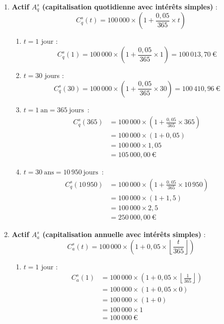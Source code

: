 \documentclass{article}
\begin{document}
\begin{enumerate}[label=\textbf{Q\arabic*.}]
    \item \textbf{Actif \( A_q^s \) (capitalisation quotidienne avec intérêts simples)} : 
    \[
    C_q^s(t) = 100\,000 \times \left(1 + \frac{0,05}{365} \times t\right)
    \]
    \begin{enumerate}[label=(\alph*)]
        \item \( t = 1 \) jour : 
        \[
        C_q^s(1) = 100\,000 \times \left(1 + \frac{0,05}{365} \times 1\right) = \boxed{100\,013,70\ \text{€}}
        \]
        
        \item $t = 30$ jours : 
        \[
        C_q^s(30) = 100\,000 \times \left(1 + \frac{0,05}{365} \times 30\right) = \boxed{100\,410,96\ \text{€}}
        \]
        
        \item $t = 1\ \text{an} = 365\ \text{jours}$~: 
        \begin{align*}
        C_q^s(365) &= 100\,000 \times \left(1 + \frac{0,05}{365} \times 365\right) \\
                 &= 100\,000 \times (1 + 0,05) \\
                 &= 100\,000 \times 1,05 \\
                 &= \boxed{105\,000,00\ \text{€}}
        \end{align*}
        
        \item $t = 30\ \text{ans} = 10\,950\ \text{jours}$~: 
        \begin{align*}
        C_q^s(10\,950) &= 100\,000 \times \left(1 + \frac{0,05}{365} \times 10\,950\right) \\
                &= 100\,000 \times (1 + 1,5) \\
                 &= 100\,000 \times 2,5 \\
                 &= \boxed{250\,000,00\ \text{€}}
        \end{align*}
        
    \end{enumerate}

    \item \textbf{Actif \( A_a^s \) (capitalisation annuelle avec intérêts simples)} : 
    \[
    C_a^s(t) = 100\,000 \times \left(1 + 0,05 \times \left\lfloor \frac{t}{365} \right\rfloor \right)
    \]
    \begin{enumerate}[label=(\alph*)]
        \item \( t = 1 \) jour : 
        \begin{align*}
        C_a^s(1) &= 100\,000 \times \left(1 + 0,05 \times \left\lfloor \frac{1}{365} \right\rfloor \right) \\
                 &= 100\,000 \times \left(1 + 0,05 \times 0 \right) \\
                 &= 100\,000 \times (1 + 0) \\
                 &= 100\,000 \times 1 \\
                 &= \boxed{100\,000\ \text{€}}
        \end{align*}
        

\end{enumerate}
\end{enumerate}
\end{document}
